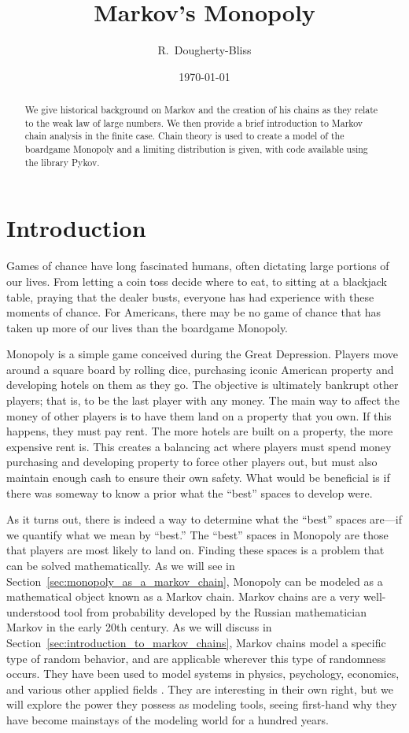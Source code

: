 \documentclass[12pt]{article}
\title{Markov's Monopoly}
\author{R.~Dougherty-Bliss}
\date{\today}
\theoremstyle{definition}
\begin{document}
\maketitle

\begin{abstract}
    We give historical background on Markov and the creation of his chains as
    they relate to the weak law of large numbers. We then provide a brief
    introduction to Markov chain analysis in the finite case. Chain theory is
    used to create a model of the boardgame Monopoly and a limiting
    distribution is given, with code available using the library Pykov.
\end{abstract}

\section{Introduction}
\label{sec:introduction}

Games of chance have long fascinated humans, often dictating large portions of
our lives. From letting a coin toss decide where to eat, to sitting at a
blackjack table, praying that the dealer busts, everyone has had experience
with these moments of chance. For Americans, there may be no game of chance
that has taken up more of our lives than the boardgame Monopoly.

Monopoly is a simple game conceived during the Great Depression. Players move
around a square board by rolling dice, purchasing iconic American property and
developing hotels on them as they go. The objective is ultimately bankrupt
other players; that is, to be the last player with any money. The main way to
affect the money of other players is to have them land on a property that you
own. If this happens, they must pay rent. The more hotels are built on a
property, the more expensive rent is. This creates a balancing act where
players must spend money purchasing and developing property to force other
players out, but must also maintain enough cash to ensure their own safety.
What would be beneficial is if there was someway to know a prior what the
``best'' spaces to develop were.

As it turns out, there is indeed a way to determine what the ``best'' spaces
are---if we quantify what we mean by ``best.'' The ``best'' spaces in Monopoly
are those that players are most likely to land on. Finding these spaces is a
problem that can be solved mathematically. As we will see in
Section~\ref{sec:monopoly_as_a_markov_chain}, Monopoly can be modeled as a
mathematical object known as a Markov chain. Markov chains are a very
well-understood tool from probability developed by the Russian mathematician
Markov in the early 20th century. As we will discuss in
Section~\ref{sec:introduction_to_markov_chains}, Markov chains model a specific
type of random behavior, and are applicable wherever this type of randomness
occurs. They have been used to model systems in physics, psychology, economics,
and various other applied fields \citep{bremaud1998markov}. They are
interesting in their own right, but we will explore the power they possess as
modeling tools, seeing first-hand why they have become mainstays of the
modeling world for a hundred years.
\end{document}

